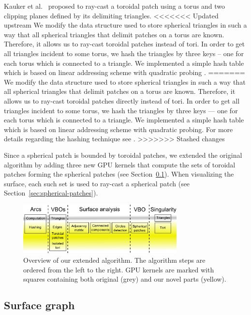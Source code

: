 Kauker et al.~\cite{kauker2013rendering} proposed to ray-cast a toroidal patch using a torus and two clipping planes defined by its delimiting triangles.
<<<<<<< Updated upstream
We modify the data structure used to store spherical triangles in such a way that all spherical triangles that delimit patches on a torus are known. Therefore, it allows us to ray-cast toroidal patches instead of tori.
In order to get all triangles incident to some torus, we hash the triangles by three keys -- one for each torus which is connected to a triangle.
We implemented a simple hash table which is based on linear addressing scheme with quadratic probing \cite{alcantara2011efficient}.
=======
We modify the data structure used to store spherical triangles in such a way that all spherical triangles that delimit patches on a torus are known. Therefore, it allows us to ray-cast toroidal patches directly instead of tori.
In order to get all triangles incident to some torus, we hash the triangles by three keys --- one for each torus which is connected to a triangle.
We implemented a simple hash table which is based on linear addressing scheme with quadratic probing.
For more details regarding the hashing technique see \cite{alcantara2011efficient}.
>>>>>>> Stashed changes

Since a spherical patch is bounded by toroidal patches, we extended the original algorithm by adding three new GPU kernels that compute the sets of toroidal patches forming the spherical patches (see Section~\ref{sec:graph}).
When visualizing the surface, each such set is used to ray-cast a spherical patch (see Section~\ref{sec:spherical-patches}).

\begin{figure}[htb]
  \centering
  \includegraphics[width=3.3in]{image/kernels.png}
  \caption{Overview of our extended algorithm.
	The algorithm steps are ordered from the left to the right.
	GPU kernels are marked with squares containing both original (grey) and our novel parts (yellow).}
	\label{fig:kernels}
\end{figure}

\subsection{Surface graph}
\label{sec:graph}
   
